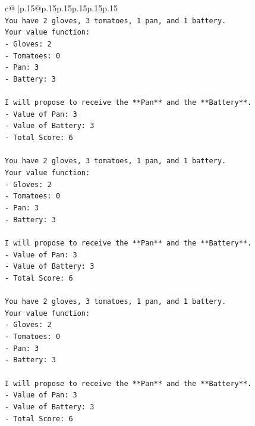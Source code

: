 \documentclass{article}
\begin{document}
{\begin{supertabular}{c@{$\;$}|p{.15\linewidth}@{}p{.15\linewidth}p{.15\linewidth}p{.15\linewidth}p{.15\linewidth}p{.15\linewidth}}
{{{\\ 
\texttt{You have 2 gloves, 3 tomatoes, 1 pan, and 1 battery.} \\
\texttt{Your value function:} \\
\texttt{{-} Gloves: 2} \\
\texttt{{-} Tomatoes: 0} \\
\texttt{{-} Pan: 3} \\
\texttt{{-} Battery: 3} \\
\\ 
\texttt{I will propose to receive the **Pan** and the **Battery**.} \\
\texttt{{-} Value of Pan: 3} \\
\texttt{{-} Value of Battery: 3} \\
\texttt{{-} Total Score: 6} \\
\\ 
\texttt{You have 2 gloves, 3 tomatoes, 1 pan, and 1 battery.} \\
\texttt{Your value function:} \\
\texttt{{-} Gloves: 2} \\
\texttt{{-} Tomatoes: 0} \\
\texttt{{-} Pan: 3} \\
\texttt{{-} Battery: 3} \\
\\ 
\texttt{I will propose to receive the **Pan** and the **Battery**.} \\
\texttt{{-} Value of Pan: 3} \\
\texttt{{-} Value of Battery: 3} \\
\texttt{{-} Total Score: 6} \\
\\ 
\texttt{You have 2 gloves, 3 tomatoes, 1 pan, and 1 battery.} \\
\texttt{Your value function:} \\
\texttt{{-} Gloves: 2} \\
\texttt{{-} Tomatoes: 0} \\
\texttt{{-} Pan: 3} \\
\texttt{{-} Battery: 3} \\
\\ 
\texttt{I will propose to receive the **Pan** and the **Battery**.} \\
\texttt{{-} Value of Pan: 3} \\
\texttt{{-} Value of Battery: 3} \\
\texttt{{-} Total Score: 6} \\
\\ 
}}}
\end{supertabular}}
\end{document}
